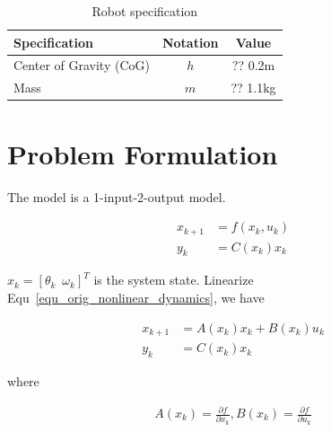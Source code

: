 \documentclass[12pt]{article}
\begin{document}
\begin{table}
  \centering
  \begin{tabular}{l|c|c}
    \hline
	Specification & Notation & Value \\ \hline
    Center of Gravity (CoG) & $h$ & ?? 0.2m \\ 
	Mass & $m$ & ?? 1.1kg \\ \hline
  \end{tabular}
  \caption{Robot specification} 
  \label{tab_robot_specification}
\end{table}


\section{Problem Formulation}
The model is a 1-input-2-output model.

\begin{align}
\label{equ_orig_nonlinear_dynamics}
x_{k+1} & = f(x_k, u_k) \\
y_k & = C(x_k)x_k
\end{align}

$x_k=[\theta_k\,\,\,\omega_k]^T$ is the system state. 
Linearize Equ~\ref{equ_orig_nonlinear_dynamics}, we have

\begin{align}
x_{k+1} & = A(x_k)x_k + B(x_k)u_k \\
y_k & = C(x_k)x_k
\end{align}

where 

\begin{align}
A(x_k) = \frac{\partial f}{\partial x_k},
B(x_k) = \frac{\partial f}{\partial u_k}
\end{align}
\end{document}
